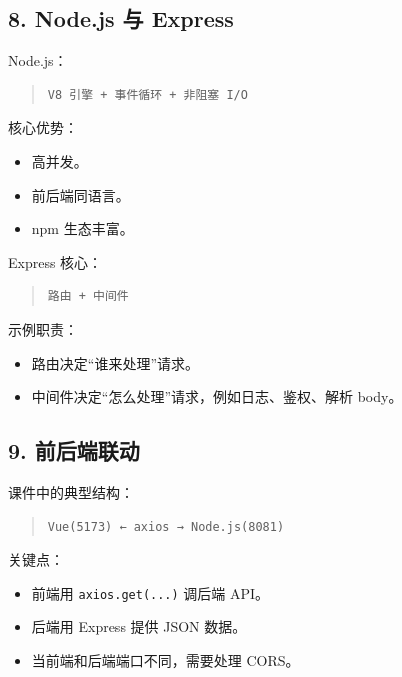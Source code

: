 \documentclass[UTF8,zihao=-4]{ctexart}
\begin{document}
\subsection{8. Node.js 与 Express}

Node.js：

\begin{quote}
\footnotesize
\begin{verbatim}
V8 引擎 + 事件循环 + 非阻塞 I/O
\end{verbatim}
\end{quote}

核心优势：

\begin{itemize}
\item 高并发。
\item 前后端同语言。
\item npm 生态丰富。
\end{itemize}

Express 核心：

\begin{quote}
\footnotesize
\begin{verbatim}
路由 + 中间件
\end{verbatim}
\end{quote}

示例职责：

\begin{itemize}
\item 路由决定“谁来处理”请求。
\item 中间件决定“怎么处理”请求，例如日志、鉴权、解析 body。
\end{itemize}

\subsection{9. 前后端联动}

课件中的典型结构：

\begin{quote}
\footnotesize
\begin{verbatim}
Vue(5173) ← axios → Node.js(8081)
\end{verbatim}
\end{quote}

关键点：

\begin{itemize}
\item 前端用 \texttt{axios.get(...)} 调后端 API。
\item 后端用 Express 提供 JSON 数据。
\item 当前端和后端端口不同，需要处理 CORS。
\end{itemize}
\end{document}
